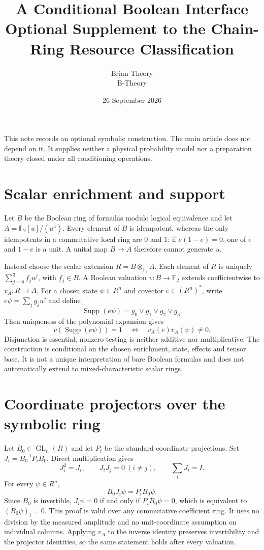 \documentclass[11pt]{article}
\title{A Conditional Boolean Interface\\Optional Supplement to the Chain-Ring Resource Classification}
\author{Brian Theory\\\small B-Theory}
\date{26 September 2026}
\begin{document}
\maketitle
This note records an optional symbolic construction. The main article does not depend on it. It supplies neither a physical probability model nor a preparation theory closed under all conditioning operations.

\section{Scalar enrichment and support}
Let $B$ be the Boolean ring of formulas modulo logical equivalence and let
$A=\mathbb F_2[u]/(u^4)$. Every element of $B$ is idempotent, whereas the only idempotents in a commutative local ring are $0$ and $1$: if $e(1-e)=0$, one of $e$ and $1-e$ is a unit. A unital map $B\to A$ therefore cannot generate $u$.

Instead choose the scalar extension $R=B\otimes_{\mathbb F_2}A$. Each element of $R$ is uniquely $\sum_{j=0}^3f_ju^j$, with $f_j\in B$. A Boolean valuation $v:B\to\mathbb F_2$ extends coefficientwise to $v_A:R\to A$. For a chosen state $\psi\in R^n$ and covector $e\in(R^n)^*$, write $e\psi=\sum_jg_ju^j$ and define
\[
\operatorname{Supp}(e\psi)=g_0\lor g_1\lor g_2\lor g_3.
\]
Then uniqueness of the polynomial expansion gives
\[
v(\operatorname{Supp}(e\psi))=1
\quad\Longleftrightarrow\quad v_A(e)v_A(\psi)\ne0.
\]
Disjunction is essential; nonzero testing is neither additive nor multiplicative. The construction is conditional on the chosen enrichment, state, effects and tensor base. It is not a unique interpretation of bare Boolean formulas and does not automatically extend to mixed-characteristic scalar rings.

\section{Coordinate projectors over the symbolic ring}
Let $B_0\in\operatorname{GL}_n(R)$ and let $P_i$ be the standard coordinate projections. Set $J_i=B_0^{-1}P_iB_0$. Direct multiplication gives
\[
J_i^2=J_i,\qquad J_iJ_j=0\ (i\ne j),\qquad \sum_iJ_i=I.
\]
For every $\psi\in R^n$,
\[
B_0J_i\psi=P_iB_0\psi.
\]
Since $B_0$ is invertible, $J_i\psi=0$ if and only if $P_iB_0\psi=0$, which is equivalent to $(B_0\psi)_i=0$. This proof is valid over any commutative coefficient ring. It uses no division by the measured amplitude and no unit-coordinate assumption on individual columns. Applying $v_A$ to the inverse identity preserves invertibility and the projector identities, so the same statement holds after every valuation.
\end{document}
